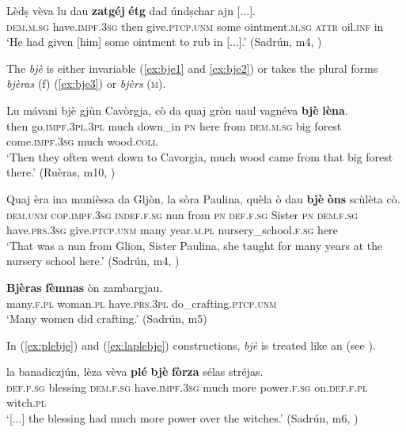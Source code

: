 \ea\label{ex:zatge2}
\gll  Lèdṣ vèva lu dau \textbf{zatgéj} \textbf{étg} dad úndṣchar ajn [...].\\
\textsc{dem.m.sg} have.\textsc{impf.3sg} then  give.\textsc{ptcp.unm} some ointment.\textsc{m.sg} \textsc{attr} oil.\textsc{inf} in\\
\glt `He had given [him] some ointment to rub in [...].' (Sadrún, m4, )
\z

The  \textit{bjè} is either invariable (\ref{ex:bje1} and \ref{ex:bje2}) or takes the plural forms \textit{bjèras} (f) (\ref{ex:bje3}) or \textit{bjèrs} (\textsc{m}).

\ea
\label{ex:bje1}
\gll  Lu mávani bjè gjùn Cavòrgja, cò da quaj gròn uaul vagnéva \textbf{bjè} \textbf{lèna}.\\
then go.\textsc{impf.3pl.3pl} much down\_in \textsc{pn} here from \textsc{dem.m.sg} big forest come.\textsc{impf.3sg} much wood.\textsc{coll}  \\
\glt `Then they often went down to Cavorgia, much wood came from that big forest there.' (Ruèras, m10,  )
\z

\ea
\label{ex:bje2}
\gll Quaj èra ina munièssa da Gljòn, la sòra Paulina, quèla ò dau \textbf{bjè} \textbf{òns} scùlèta cò.\\
\textsc{dem.unm} \textsc{cop.impf.3sg} \textsc{indef.f.sg} nun from \textsc{pn} \textsc{def.f.sg} Sister \textsc{pn} \textsc{dem.f.sg}  have.\textsc{prs.3sg} give.\textsc{ptcp.unm} many year.\textsc{m.pl} nursery\_school.\textsc{f.sg} here\\
\glt `That was a nun from Glion, Sister Paulina, she taught for many years at the nursery school here.' (Sadrún, m4, )
\z

\ea
\label{ex:bje3}
\gll \textbf{Bjèras} \textbf{fèmnas} òn zambargjau.\\
many.\textsc{f.pl} woman.\textsc{pl} have.\textsc{prs.3pl} do\_crafting.\textsc{ptcp.unm}\\
\glt `Many women did crafting.' (Sadrún, m5)
\z

In  (\ref{ex:plebje}) and  (\ref{ex:laplebje}) constructions, \textit{bjè} is treated like an  (see ). 

\ea
\label{ex:plebje}
	\gll [...] la banadiczjún, lèza vèva \textbf{plé} \textbf{bjè} \textbf{fòrza} sélas stréjas.\\
{} \textsc{def.f.sg} blessing \textsc{dem.f.sg} have.\textsc{impf.3sg} much more power.\textsc{f.sg} on.\textsc{def.f.pl} witch.\textsc{pl}\\
\glt `[...] the blessing had much more power over the witches.' (Sadrún, m6, )
\z

